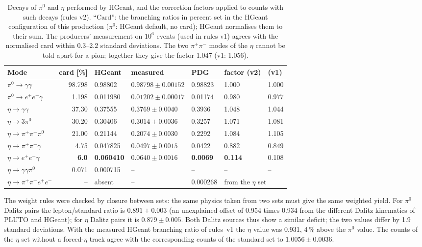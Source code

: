 \documentclass[11pt,a4paper]{article}
\newcommand{\piz}{\ensuremath{\pi^{0}}\xspace}
\newcommand{\ee}{\ensuremath{e^{+}e^{-}}\xspace}
\newcommand{\pipi}{\ensuremath{\pi^{+}\pi^{-}}\xspace}
\newcommand{\ppee}{\ensuremath{\pi^{+}\pi^{-}e^{+}e^{-}}\xspace}
\begin{document}
\begin{table}[H]
\centering
\caption{Decays of \piz and $\eta$ performed by HGeant, and the correction factors applied to
counts with such decays (rules v2). ``Card'': the branching ratios in percent set in the HGeant
configuration of this production (\piz: HGeant default, no card); HGeant normalises them to
their sum. The producers' measurement on $10^6$ events (used in rules v1) agrees with the
normalised card within 0.3--2.2 standard deviations. The two \pipi modes of the $\eta$ cannot be
told apart for a pion; together they give the factor 1.047 (v1: 1.056).}
\label{tab:hgeant}
\small
\begin{tabular}{@{}l r l l l l l@{}}
\toprule
Mode & card [\%] & HGeant & measured & PDG & factor (v2) & (v1) \\
\midrule
$\piz\to\gamma\gamma$     & 98.798 & 0.98802 & $0.98798\pm0.00152$ & 0.98823 & 1.000 & 1.000 \\
$\piz\to\ee\gamma$        & 1.198 & 0.011980 & $0.01202\pm0.00017$ & 0.01174 & 0.980 & 0.977 \\
$\eta\to\gamma\gamma$     & 37.30 & 0.37555 & $0.3769\pm0.0040$ & 0.3936 & 1.048 & 1.044 \\
$\eta\to3\piz$            & 30.20 & 0.30406 & $0.3014\pm0.0036$ & 0.3257 & 1.071 & 1.081 \\
$\eta\to\pipi\piz$        & 21.00 & 0.21144 & $0.2074\pm0.0030$ & 0.2292 & 1.084 & 1.105 \\
$\eta\to\pipi\gamma$      & 4.75 & 0.047825 & $0.0497\pm0.0015$ & 0.0422 & 0.882 & 0.849 \\
$\eta\to\ee\gamma$        & \textbf{6.0} & \textbf{0.060410} & $0.0640\pm0.0016$ & \textbf{0.0069} & \textbf{0.114} & 0.108 \\
$\eta\to\gamma\gamma\piz$ & 0.071 & 0.000715 & -- & -- & -- & -- \\
$\eta\to\ppee$            & -- & absent & -- & 0.000268 & \multicolumn{2}{l}{from the $\eta$ set} \\
\bottomrule
\end{tabular}
\end{table}

The weight rules were checked by closure between sets: the same physics taken from two sets
must give the same weighted yield. For \piz Dalitz pairs the lepton/standard ratio is
$0.891\pm0.003$ (an unexplained offset of 0.954 times 0.934 from the different Dalitz
kinematics of PLUTO and HGeant); for $\eta$ Dalitz pairs it is $0.879\pm0.005$. Both Dalitz sources thus
show a similar deficit; the two values differ by 1.9 standard deviations. With the measured HGeant
branching ratio of rules~v1 the $\eta$ value was 0.931, 4\,\% above the \piz value. The counts of the $\eta$
set without a forced-$\eta$ track agree with the corresponding counts of the standard set to
$1.0056\pm0.0036$.
\end{document}
